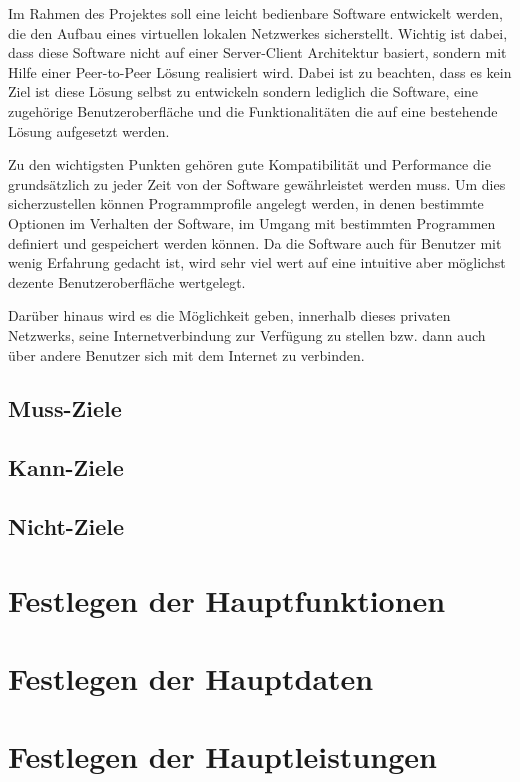 \documentclass[a4paper,12pt]{scrreprt}
\begin{document}
		Im Rahmen des Projektes soll eine leicht bedienbare Software entwickelt werden, die den Aufbau eines virtuellen lokalen Netzwerkes sicherstellt. Wichtig ist dabei, dass diese Software nicht auf einer Server-Client Architektur basiert, sondern mit Hilfe einer Peer-to-Peer Lösung realisiert wird. Dabei ist zu beachten, dass es kein Ziel ist diese Lösung selbst zu entwickeln sondern lediglich die Software, eine zugehörige Benutzeroberfläche und die Funktionalitäten die auf eine bestehende Lösung aufgesetzt werden.
		
		Zu den wichtigsten Punkten gehören gute Kompatibilität und Performance die grundsätzlich zu jeder Zeit von der Software gewährleistet werden muss. Um dies sicherzustellen können Programmprofile angelegt werden, in denen bestimmte Optionen im Verhalten der Software, im Umgang mit bestimmten Programmen definiert und gespeichert werden können. Da die Software auch für Benutzer mit wenig Erfahrung gedacht ist, wird sehr viel wert auf eine intuitive aber möglichst dezente Benutzeroberfläche wertgelegt.
		
		Darüber hinaus wird es die Möglichkeit geben, innerhalb dieses privaten Netzwerks, seine Internetverbindung zur Verfügung zu stellen bzw. dann auch über andere Benutzer sich mit dem Internet zu verbinden.
		
			
		\subsection{Muss-Ziele}
			
		\subsection{Kann-Ziele}
			
			
		\subsection{Nicht-Ziele}
			
	\section{Festlegen der Hauptfunktionen}
		
	\section{Festlegen der Hauptdaten}
		
	\section{Festlegen der Hauptleistungen}
		
\end{document}

